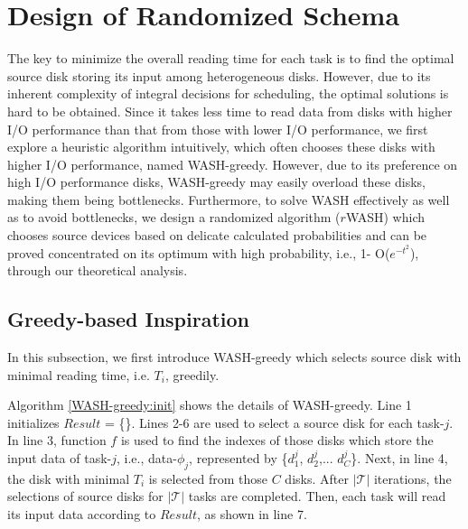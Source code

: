 \documentclass[conference]{IEEEtran}
\begin{document}
\section{Design of Randomized Schema}\label{DESIGN_ALGORITHM}

The key to minimize the overall reading time for each task is to find the optimal source disk storing its input among heterogeneous disks. However, due to its inherent complexity of integral decisions for scheduling, the optimal solutions is hard to be obtained. Since it takes less time to read data from disks with higher I/O performance than that from those with lower I/O performance, we first explore a heuristic algorithm intuitively, which often chooses these disks with higher I/O performance, named WASH-greedy. However, due to its preference on high I/O performance disks, WASH-greedy may easily overload these disks, making them being bottlenecks. 
Furthermore, to solve WASH effectively as well as to avoid bottlenecks, we design a randomized algorithm ($r$WASH) which chooses source devices based on delicate calculated probabilities and can be proved concentrated on its optimum with high probability, i.e., 1- O($e^{-t^2}$), through our theoretical analysis.

\subsection{Greedy-based Inspiration}\label{Heuristic}
In this subsection, we first introduce WASH-greedy which selects source disk with minimal reading time, i.e. $T_i$, greedily.

Algorithm \ref{WASH-greedy:init} shows the details of WASH-greedy. Line 1 initializes $Result$ = \{\}. Lines 2-6 are used to select a source disk for each task-$j$. In line 3, function $f$ is used to find the indexes of those disks which store the input data of task-$j$, i.e., data-$\phi_j$, represented by \{$d_{1}^j$, $d_{2}^j$,... $d_{C}^j$\}. Next, in line 4, the disk with minimal $T_i$ is selected from those $C$ disks. After $\mathcal{|T|}$ iterations, the selections of source disks for $\mathcal{|T|}$ tasks are completed. Then, each task will read its input data according to $Result$, as shown in line 7.
\end{document}
